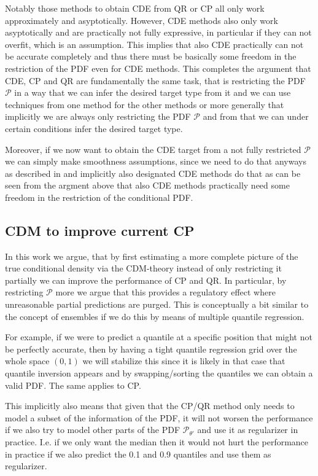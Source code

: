 Notably those methods to obtain CDE from QR or CP all only work approximately and asyptotically. However, CDE methods also only work asyptotically and are practically not fully expressive, in particular if they can not overfit, which is an assumption. This implies that also CDE practically can not be accurate completely and thus there must be basically some freedom in the restriction of the PDF even for CDE methods. This completes the argument that CDE, CP and QR are fundamentally the same task, that is restricting the PDF $\mathcal{P}$ in a way that we can infer the desired target type from it and we can use techniques from one method for the other methods or more generally that implicitly we are always only restricting the PDF $\mathcal{P}$ and from that we can under certain conditions infer the desired target type.

Moreover, if we now want to obtain the CDE target from a not fully restricted $\mathcal{P}$ we can simply make smoothness assumptions, since we need to do that anyways as described in  and implicitly also designated CDE methods do that as can be seen from the argment above that also CDE methods practically need some freedom in the restriction of the conditional PDF.

\subsection{CDM to improve current CP}%
In this work we argue, that by first estimating a more complete picture of the true conditional density via the CDM-theory instead of only restricting it partially we can improve the performance of CP and QR. In particular, by restricting $\mathcal{P}$ more we argue that this provides a regulatory effect where unreasonable partial predictions are purged. This is conceptually a bit similar to the concept of ensembles if we do this by means of multiple quantile regression.

For example, if we were to predict a quantile at a specific position that might not be perfectly accurate, then by having a tight quantile regression grid over the whole space $(0,1)$ we will stabilize this since it is likely in that case that quantile inversion appears and by swapping/sorting the quantiles we can obtain a valid PDF. The same applies to CP.

This implicitly also means that given that the CP/QR method only needs to model a subset of the information of the PDF, it will not worsen the performance if we also try to model other parts of the PDF $\mathcal{P}_{\theta'}$ and use it as regularizer in practice. I.e. if we only want the median then it would not hurt the performance in practice if we also predict the 0.1 and 0.9 quantiles and use them as regularizer.

